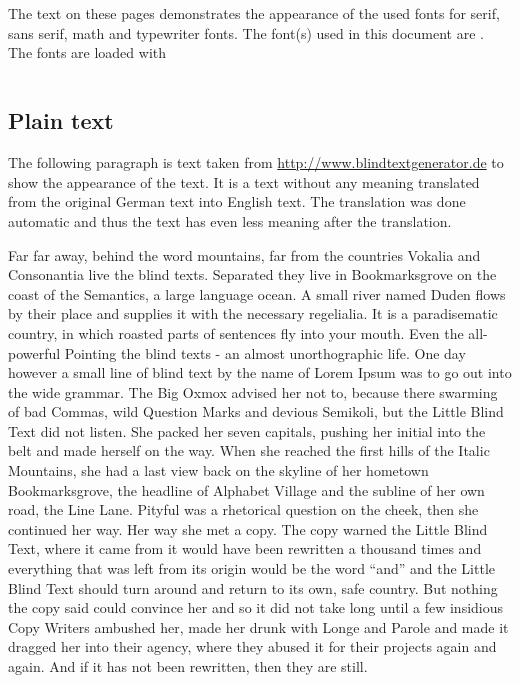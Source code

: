 \documentclass[%
   final,      %
   paper=a4,%
   paper=portrait, %
   pagesize=auto, %
   fontsize=11pt,%
   version=last, %
   english, %
 ]{scrbook} %
\newcommand{\fontdesc}{}
\begin{document}
\pagestyle{empty}
\ofoot[]{} 

\chapter*{\fontdesc}
The text on these pages demonstrates the appearance of the used fonts for serif, sans serif, math and typewriter fonts. The font(s) used in this document are \textit{\fontdesc}. The fonts are loaded with
\begin{lstlisting}[style=demostyle]
%%? <*fontcode*>
\end{lstlisting}

\section*{Plain text}
The following paragraph is text taken from \url{http://www.blindtextgenerator.de} to show the appearance of the text. It is a text without any meaning translated from the original German text into English text. The translation was done automatic and thus the text has even less meaning after the translation.

Far far away, behind the word mountains, far from the countries Vokalia and Consonantia live the blind texts. Separated they live in Bookmarksgrove on the coast of the Semantics, a large language ocean. A small river named Duden flows by their place and supplies it with the necessary regelialia. It is a paradisematic country, in which roasted parts of sentences fly into your mouth. Even the all-powerful Pointing the blind texts - an almost unorthographic life. One day however a small line of blind text by the name of Lorem Ipsum was to go out into the wide grammar. The Big Oxmox advised her not to, because there swarming of bad Commas, wild Question Marks and devious Semikoli, but the Little Blind Text did not listen. She packed her seven capitals, pushing her initial into the belt and made herself on the way. When she reached the first hills of the Italic Mountains, she had a last view back on the skyline of her hometown Bookmarksgrove, the headline of Alphabet Village and the subline of her own road, the Line Lane. Pityful was a rhetorical question on the cheek, then she continued her way. Her way she met a copy. The copy warned the Little Blind Text, where it came from it would have been rewritten a thousand times and everything that was left from its origin would be the word \enquote{and} and the Little Blind Text should turn around and return to its own, safe country. But nothing the copy said could convince her and so it did not take long until a few insidious Copy Writers ambushed her, made her drunk with Longe and Parole and made it dragged her into their agency, where they abused it for their projects again and again. And if it has not been rewritten, then they are still. 
\end{document}
